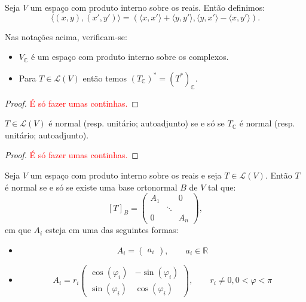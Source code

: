 \documentclass[11pt,twoside,a4paper]{book}
\begin{document}
\begin{definicao}
Seja $V$ um espaço com produto interno sobre os reais. Então definimos:
\[
\langle(x,y),(x',y')\rangle=\left(\langle x,x'\rangle+\langle y,y'\rangle,\langle y,x'\rangle-\langle x,y'\rangle\right).
\]
\end{definicao}

\begin{proposicao}
Nas notações acima, verificam-se:
\begin{itemize}
\item $V_\mathbb{C}$ é um espaço com produto interno sobre os complexos.
\item Para $T\in\mathcal{L}(V)$ então temos $(T_\mathbb{C})^*=(T^*)_\mathbb{C}.$
\end{itemize}
\end{proposicao}
\begin{proof}
\textcolor{red}{É só fazer umas continhas.}
\end{proof}

\begin{corolario}
$T\in\mathcal{L}(V)$ é normal (resp. unitário; autoadjunto) se e só se $T_\mathbb{C}$ é normal (resp. unitário; autoadjunto).
\end{corolario}
\begin{proof}
\textcolor{red}{É só fazer umas continhas.}
\end{proof}

\begin{teorema}
Seja $V$ um espaço com produto interno sobre os reais e seja $T\in\mathcal{L}(V)$. Então $T$ é normal se e só se existe uma base ortonormal $B$ de $V$ tal que:
\[
[T]_B=\begin{pmatrix}
A_1&&0\\&\ddots&\\0&&A_n
\end{pmatrix},
\]
em que $A_i$ esteja em uma das seguintes formas:
\begin{itemize}
\item
\[
A_i=\begin{pmatrix}
a_i
\end{pmatrix},\quad\quad a_i\in\mathbb{R}
\]
\item
\[
A_i=r_i\begin{pmatrix}
\cos(\varphi_i)&-\sin(\varphi_i)\\\sin(\varphi_i)&\cos(\varphi_i)
\end{pmatrix},\quad\quad r_i\neq 0,0<\varphi<\pi
\]
\end{itemize}
\end{teorema}

\printindex
\end{document}
